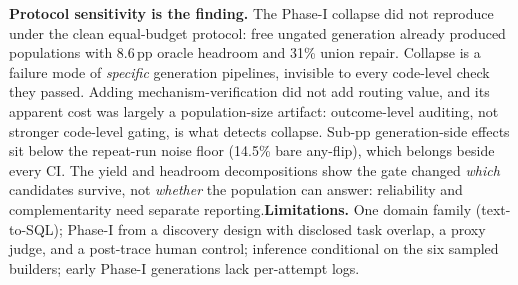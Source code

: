 \textbf{Protocol sensitivity is the finding.} The Phase-I collapse did not
reproduce under the clean equal-budget protocol: free ungated generation
already produced populations with 8.6\,pp oracle headroom and 31\% union
repair. Collapse is a failure mode of \emph{specific} generation pipelines,
invisible to every code-level check they passed. Adding
mechanism-verification did not add routing value, and its apparent cost was
largely a population-size artifact: outcome-level auditing, not stronger
code-level gating, is what detects collapse. Sub-pp generation-side effects
sit below the repeat-run noise floor (14.5\% bare any-flip), which belongs
beside every CI. The yield and headroom decompositions show the gate
changed \emph{which} candidates survive, not \emph{whether} the
population can answer: reliability and complementarity need separate
reporting.\textbf{Limitations.} One domain family (text-to-SQL); Phase-I from a
discovery design with disclosed task overlap, a proxy judge, and a
post-trace human control; inference conditional on the six sampled
builders; early Phase-I generations lack per-attempt logs.
